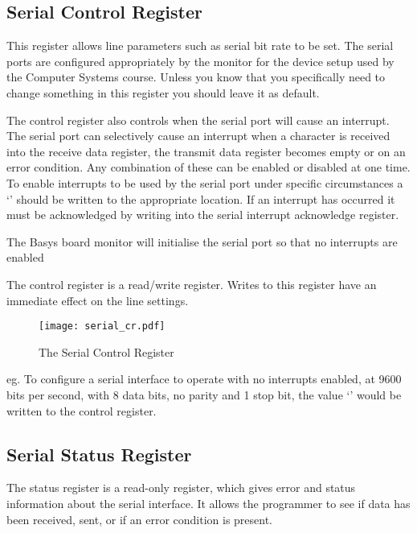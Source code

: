 \newpage
\subsection{Serial Control Register}

This register allows line parameters such as serial bit rate to be
set. The serial ports are configured appropriately by the monitor for
the device setup used by the Computer Systems course. Unless you know
that you specifically need to change something in this register you
should leave it as default.

The control register also controls when the serial port will cause an
interrupt. The serial port can selectively cause an interrupt when a
character is received into the receive data register, the transmit
data register becomes empty or on an error condition. Any combination of
these can be enabled or disabled at one time. To enable interrupts to
be used by the serial port under specific circumstances a `'
should be written to the appropriate location. If an interrupt has
occurred it must be acknowledged by writing into the serial interrupt
acknowledge register.

The Basys board monitor will initialise the serial port so that no
interrupts are enabled

The control register is a read/write register. Writes to this register
have an immediate effect on the line settings.

\begin{figure}[h]
\begin{center}
\texttt{[image: serial\_cr.pdf]}
\caption{The Serial Control Register}
\label{serial_cr_pic}
\end{center}
\end{figure}

\noindent
eg. To configure a serial interface to operate with no interrupts
enabled, at 9600 bits per second, with 8 data bits, no parity and 1
stop bit, the value `' would be written to the
control register.

\newpage
\subsection{Serial Status Register}

The status register is a read-only register, which gives error and
status information about the serial interface. It allows the
programmer to see if data has been received, sent, or if an error
condition is present.

